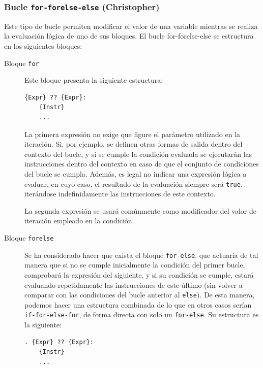 \documentclass[11pt, english]{article}
\begin{document}
\subsubsection{Bucle \texttt{for-forelse-else} (Christopher)}
Este tipo de bucle permiten modificar el valor de una variable mientras se realiza la evaluación lógica de uno de sus bloques. El bucle for-forelse-else se estructura en los siguientes bloques:

\begin{description}
	\item[Bloque \texttt{for}] Este bloque presenta la siguiente estructura:
	\begin{center}
\begin{lstlisting}
{Expr} ?? {Expr}:
	{Instr}
	...
\end{lstlisting}
	\end{center}
	
	La primera expresión no exige que figure el parámetro utilizado en la iteración. Si, por ejemplo, se definen otras formas de salida dentro del contexto del bucle, y si se cumple la condición evaluada se ejecutarán las instrucciones dentro del contexto en caso de que el conjunto de condiciones del bucle se cumpla. Además, es legal no indicar una expresión lógica a evaluar, en cuyo caso, el resultado de la evaluación siempre será \texttt{true}, iterándose indefinidamente las instrucciones de este contexto. 

	La segunda expresión se usará comúnmente como modificador del valor de iteración empleado en la condición.
	
	\item[Bloque \texttt{forelse}] Se ha considerado hacer que exista el bloque \texttt{for-else}, que actuaría de tal manera que si no se cumple inicialmente la condición del primer bucle, comprobará la expresión del siguiente, y si su condición se cumple, estará evaluando repetidamente las instrucciones de este último (sin volver a comparar con las condiciones del bucle anterior al \texttt{else}). De esta manera, podemos hacer una estructura combinada de lo que en otros casos serían \texttt{if-for-else-for}, de forma directa con solo un \texttt{for-else}. \vspace{10px}Su estructura es la siguiente:
	\begin{center}
\begin{lstlisting}
. {Expr} ?? {Expr}:
	{Instr}
	...
\end{lstlisting}
	\end{center}
	

\end{description}
\end{document}
